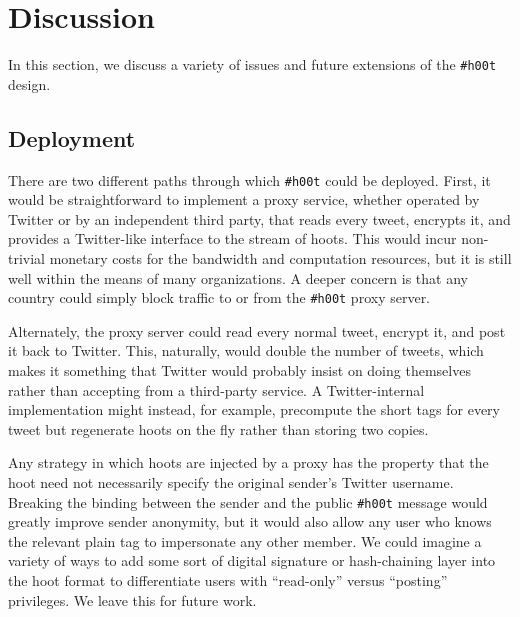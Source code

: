 \documentclass{sig-alternate-arxiv}
\newcommand{\hlfxnote}[1]{\fxnote{\hl{#1}}}
\newcommand{\hoot}{{\tt \#h00t}\xspace}
\newcommand{\msg}{hoot\xspace}
\newcommand{\msgs}{hoots\xspace}
\begin{document}



\fi

%
\section{Discussion} \label{sec:discuss}

In this section, we discuss a variety of issues and future extensions of the \hoot design.

\subsection{Deployment}

There are two different paths through which \hoot could be deployed. First, it would be straightforward to implement a proxy service, whether operated by Twitter or by an independent third party, that reads every tweet, encrypts it, and provides a Twitter-like interface to the stream of \msgs. This would incur non-trivial monetary costs for the bandwidth and computation resources, but it is still well within the means of many organizations. A deeper concern is that any country could simply block traffic to or from the \hoot proxy server.

Alternately, the proxy server could read every normal tweet, encrypt it, and post it back to Twitter. This, naturally, would double the number of tweets, which makes it something that Twitter would probably insist on doing themselves rather than accepting from a third-party service. A Twitter-internal implementation might instead, for example, precompute the short tags for every tweet but regenerate \msgs on the fly rather than storing two copies.

Any strategy in which \msgs are injected by a proxy has the property that the \msg need not necessarily specify the original sender's Twitter username.  Breaking the binding between the sender and the public \hoot message would greatly improve sender anonymity, but it would also allow any user who knows the relevant plain tag to impersonate any other member. We could imagine a variety of ways to add some sort of digital signature or hash-chaining layer into the \msg format to differentiate users with ``read-only'' versus ``posting'' privileges. We leave this for future work.
\end{document}
